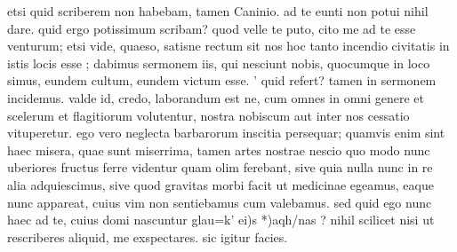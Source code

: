 


 etsi quid scriberem non habebam, tamen Caninio. ad te eunti non potui nihil dare. quid ergo potissimum scribam? quod velle te puto, cito me ad te esse venturum; etsi vide, quaeso, satisne rectum sit nos hoc tanto incendio civitatis in istis locis esse ; dabimus sermonem iis, qui nesciunt nobis, quocumque in loco simus, eundem cultum, eundem victum esse. ' quid refert? tamen in sermonem incidemus. valde id, credo, laborandum est ne, cum omnes in omni genere et scelerum et flagitiorum volutentur, nostra nobiscum aut inter nos cessatio vituperetur. ego vero neglecta barbarorum inscitia persequar; quamvis enim sint haec misera, quae sunt miserrima, tamen artes nostrae nescio quo modo nunc uberiores fructus ferre videntur quam olim ferebant, sive quia nulla nunc in re alia adquiescimus, sive quod gravitas morbi facit ut medicinae egeamus, eaque nunc appareat, cuius vim non sentiebamus cum valebamus. sed quid ego nunc haec ad te, cuius domi nascuntur glau=k' ei)s *)aqh/nas ? nihil scilicet nisi ut rescriberes aliquid, me exspectares. sic igitur facies.
